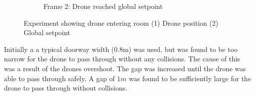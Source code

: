\documentclass[capstone_report.tex]{subfiles}
\begin{document}
\begin{figure}[H]
\begin{subfigure}[b]{0.5\textwidth}
        \caption{Frame 2: Drone reached global setpoint}
        \label{fig:enter_room_2}
    \end{subfigure}
    \caption{Experiment showing drone entering room (1) Drone position (2) Global setpoint}
    \label{fig:enter_room}
\end{figure}

Initially a a typical doorway width (0.8m) was used, but was found to be too narrow for the drone to pass through without any collisions.  The cause of this was a result of the drones overshoot.  The gap was increased until the drone was able to pass through safely.  A gap of $1m$ was found to be sufficiently large for the drone to pass through without collisions.
\end{document}
